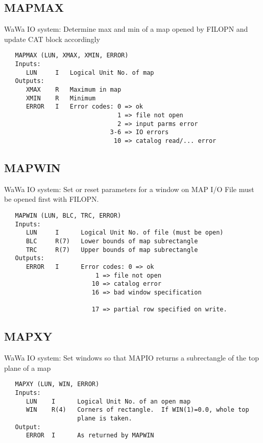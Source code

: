 \subsection{MAPMAX}
WaWa IO system: Determine max and min of a map opened by FILOPN
and update CAT block accordingly
\begin{verbatim}
   MAPMAX (LUN, XMAX, XMIN, ERROR)
   Inputs:
      LUN     I   Logical Unit No. of map
   Outputs:
      XMAX    R   Maximum in map
      XMIN    R   Minimum
      ERROR   I   Error codes: 0 => ok
                               1 => file not open
                               2 => input parms error
                             3-6 => IO errors
                              10 => catalog read/... error

\end{verbatim}

\subsection{MAPWIN}
WaWa IO system: Set or reset parameters for a window on MAP I/O
File must be opened first with FILOPN.
\begin{verbatim}
   MAPWIN (LUN, BLC, TRC, ERROR)
   Inputs:
      LUN     I      Logical Unit No. of file (must be open)
      BLC     R(7)   Lower bounds of map subrectangle
      TRC     R(7)   Upper bounds of map subrectangle
   Outputs:
      ERROR   I      Error codes: 0 => ok
                         1 => file not open
                        10 => catalog error
                        16 => bad window specification

                        17 => partial row specified on write.
\end{verbatim}

\subsection{MAPXY}
WaWa IO system: Set windows so that MAPIO returns a subrectangle
of the top plane of a map
\begin{verbatim}
   MAPXY (LUN, WIN, ERROR)
   Inputs:
      LUN    I      Logical Unit No. of an open map
      WIN    R(4)   Corners of rectangle.  If WIN(1)=0.0, whole top
                    plane is taken.
   Output:
      ERROR  I      As returned by MAPWIN

\end{verbatim}

